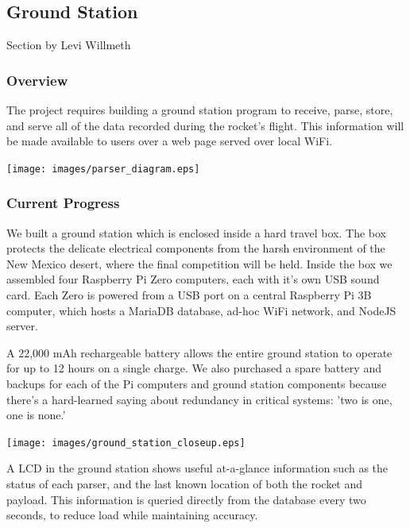 \documentclass[onecolumn, draftclsnofoot, 10pt, compsoc]{IEEEtran}
\begin{document}

\subsection{Ground Station}
Section by Levi Willmeth
\subsubsection{Overview}
The project requires building a ground station program to receive, parse, store, and serve all of the data recorded during the rocket's flight.  This information will be made available to users over a web page served over local WiFi.

\begin{center}
	\texttt{[image: images/parser\_diagram.eps]}
    \label{gs-diagram}
\end{center}

\subsubsection{Current Progress}
We built a ground station which is enclosed inside a hard travel box.  The box protects the delicate electrical components from the harsh environment of the New Mexico desert, where the final competition will be held.  Inside the box we assembled four Raspberry Pi Zero computers, each with it's own USB sound card.  Each Zero is powered from a USB port on a central Raspberry Pi 3B computer, which hosts a MariaDB database, ad-hoc WiFi network, and NodeJS server.

A 22,000 mAh rechargeable battery allows the entire ground station to operate for up to 12 hours on a single charge. We also purchased a spare battery and backups for each of the Pi computers and ground station components because there's a hard-learned saying about redundancy in critical systems:  'two is one, one is none.'

\begin{center}
	\texttt{[image: images/ground\_station\_closeup.eps]}
    \label{gs_closeup}
\end{center}

A LCD in the ground station shows useful at-a-glance information such as the status of each parser, and the last known location of both the rocket and payload.  This information is queried directly from the database every two seconds, to reduce load while maintaining accuracy.
\end{document}
